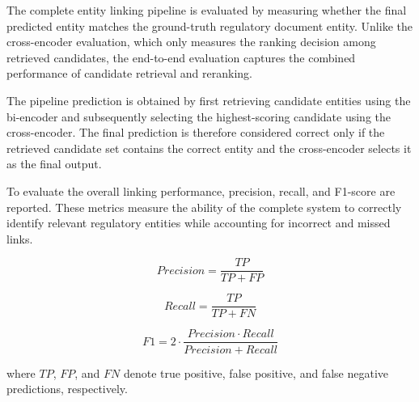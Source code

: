 The complete entity linking pipeline is evaluated by measuring whether the final predicted entity matches the ground-truth regulatory document entity. Unlike the cross-encoder evaluation, which only measures the ranking decision among retrieved candidates, the end-to-end evaluation captures the combined performance of candidate retrieval and reranking.

The pipeline prediction is obtained by first retrieving candidate entities using the bi-encoder and subsequently selecting the highest-scoring candidate using the cross-encoder. The final prediction is therefore considered correct only if the retrieved candidate set contains the correct entity and the cross-encoder selects it as the final output.

To evaluate the overall linking performance, precision, recall, and F1-score are reported. These metrics measure the ability of the complete system to correctly identify relevant regulatory entities while accounting for incorrect and missed links.

\[
Precision = \frac{TP}{TP+FP}
\]

\[
Recall = \frac{TP}{TP+FN}
\]

\[
F1 = 2 \cdot \frac{Precision \cdot Recall}{Precision + Recall}
\]

where $TP$, $FP$, and $FN$ denote true positive, false positive, and false negative predictions, respectively.